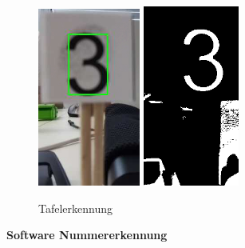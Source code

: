 \documentclass[../../main.tex]{subfiles}
\begin{document}
     \begin{figure}[H] %
        \centering
        \includegraphics[width=0.3\textwidth]{signal_number.png}
        \hspace{1cm}
        \includegraphics[width=0.28\textwidth]{signal_threshold.png}
        \caption{Tafelerkennung}
        \label{fig:tafelerkennung}
    \end{figure}

    \textbf{Software Nummererkennung}


    
\end{document}
